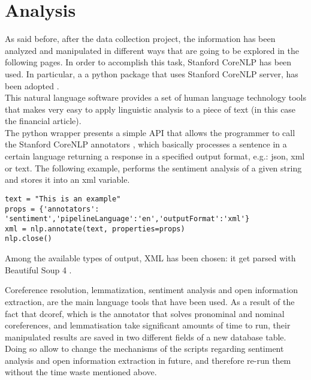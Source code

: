 \section{Analysis}
As said before, after the data collection project, the information has been analyzed and manipulated in different ways that are going to be explored in the following pages. In order to accomplish this task,
Stanford CoreNLP \cite{stanfordcorenlp} has been used. In particular, a a python package that uses Stanford CoreNLP server, has been adopted \cite{corenlpwrapper}. \\
This natural language software provides a set of human language technology tools that makes very easy to apply linguistic analysis to a piece of text (in this case the financial article). \\
The python wrapper presents a simple API that allows the programmer to call the Stanford CoreNLP annotators \cite{annotators}, which basically processes a sentence in a certain language returning a response in a specified output format, e.g.: json, xml or text. The following example, performs the sentiment analysis of a given string and stores it into an xml variable.
\begin{verbatim}
text = "This is an example"
props = {'annotators': 'sentiment','pipelineLanguage':'en','outputFormat':'xml'}
xml = nlp.annotate(text, properties=props)
nlp.close()
\end{verbatim}
Among the available types of output, XML has been chosen: it get parsed with Beautiful Soup 4 \cite{bs4}. \par 
Coreference resolution, lemmatization, sentiment analysis and open information extraction, are the main language tools that have been used. As a result of the fact that dcoref, which is the annotator that solves pronominal and nominal coreferences, and lemmatisation take significant amounts of time to run, their manipulated results are saved in two different fields of a new database table. Doing so allow to change the mechanisms of the scripts regarding sentiment analysis and open information extraction in future, and therefore re-run them without the time waste mentioned above.



